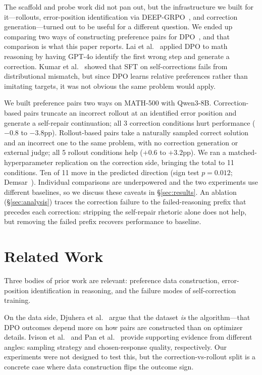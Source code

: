 \documentclass{article}
\begin{document}
The scaffold and probe work did not pan out, but the infrastructure we built for it---rollouts, error-position identification via DEEP-GRPO~\cite{deepgrpo2026}, and correction generation---turned out to be useful for a different question.
We ended up comparing two ways of constructing preference pairs for DPO~\cite{rafailov2023dpo}, and that comparison is what this paper reports.
Lai et al.~\cite{lai2024stepdpo} applied DPO to math reasoning by having GPT-4o identify the first wrong step and generate a correction.
Kumar et al.~\cite{kumar2024score} showed that SFT on self-corrections fails from distributional mismatch, but since DPO learns relative preferences rather than imitating targets, it was not obvious the same problem would apply.

We built preference pairs two ways on MATH-500 with Qwen3-8B.
Correction-based pairs truncate an incorrect rollout at an identified error position and generate a self-repair continuation; all 3 correction conditions hurt performance ($-0.8$ to $-3.8$pp).
Rollout-based pairs take a naturally sampled correct solution and an incorrect one to the same problem, with no correction generation or external judge; all 5 rollout conditions help ($+0.6$ to $+3.2$pp).
We ran a matched-hyperparameter replication on the correction side, bringing the total to 11 conditions.
Ten of 11 move in the predicted direction (sign test $p = 0.012$; Demsar~\cite{demsar2006}).
Individual comparisons are underpowered and the two experiments use different baselines, so we discuss these caveats in \S\ref{sec:results}.
An ablation (\S\ref{sec:analysis}) traces the correction failure to the failed-reasoning prefix that precedes each correction: stripping the self-repair rhetoric alone does not help, but removing the failed prefix recovers performance to baseline.

\section{Related Work}
\label{sec:related}

Three bodies of prior work are relevant: preference data construction, error-position identification in reasoning, and the failure modes of self-correction training.

On the data side, Djuhera et al.~\cite{datasalgorithm2025} argue that the dataset \emph{is} the algorithm---that DPO outcomes depend more on how pairs are constructed than on optimizer details.
Ivison et al.~\cite{unpackingdpo2024} and Pan et al.~\cite{whatmatters2025} provide supporting evidence from different angles: sampling strategy and chosen-response quality, respectively.
Our experiments were not designed to test this, but the correction-vs-rollout split is a concrete case where data construction flips the outcome sign.
\end{document}
